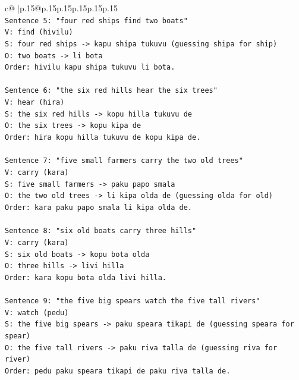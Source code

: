 \documentclass{article}
\begin{document}
{\begin{supertabular}{c@{$\;$}|p{.15\linewidth}@{}p{.15\linewidth}p{.15\linewidth}p{.15\linewidth}p{.15\linewidth}p{.15\linewidth}}
{{{\\ 
\texttt{Sentence 5: "four red ships find two boats"} \\
\texttt{V: find (hivilu)} \\
\texttt{S: four red ships {-}> kapu shipa tukuvu (guessing shipa for ship)} \\
\texttt{O: two boats {-}> li bota} \\
\texttt{Order: hivilu kapu shipa tukuvu li bota.} \\
\\ 
\texttt{Sentence 6: "the six red hills hear the six trees"} \\
\texttt{V: hear (hira)} \\
\texttt{S: the six red hills {-}> kopu hilla tukuvu de} \\
\texttt{O: the six trees {-}> kopu kipa de} \\
\texttt{Order: hira kopu hilla tukuvu de kopu kipa de.} \\
\\ 
\texttt{Sentence 7: "five small farmers carry the two old trees"} \\
\texttt{V: carry (kara)} \\
\texttt{S: five small farmers {-}> paku papo smala} \\
\texttt{O: the two old trees {-}> li kipa olda de (guessing olda for old)} \\
\texttt{Order: kara paku papo smala li kipa olda de.} \\
\\ 
\texttt{Sentence 8: "six old boats carry three hills"} \\
\texttt{V: carry (kara)} \\
\texttt{S: six old boats {-}> kopu bota olda} \\
\texttt{O: three hills {-}> livi hilla} \\
\texttt{Order: kara kopu bota olda livi hilla.} \\
\\ 
\texttt{Sentence 9: "the five big spears watch the five tall rivers"} \\
\texttt{V: watch (pedu)} \\
\texttt{S: the five big spears {-}> paku speara tikapi de (guessing speara for spear)} \\
\texttt{O: the five tall rivers {-}> paku riva talla de (guessing riva for river)} \\
\texttt{Order: pedu paku speara tikapi de paku riva talla de.} \\
\\ 
}}}
\end{supertabular}}
\end{document}
